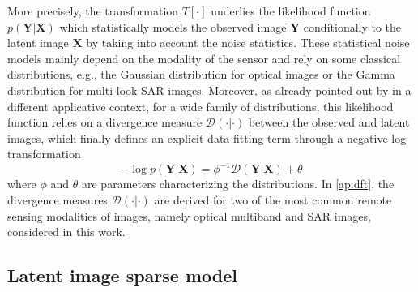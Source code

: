 \documentclass[review]{elsarticle}
\begin{document}
More precisely, the transformation $\mathit{T}[\cdot]$ underlies the likelihood function $p(\mathbf{Y}|\mathbf{X})$  which statistically models the observed image $\mathbf{Y}$ conditionally to the latent image $\mathbf{X}$ by taking into account the noise statistics. These statistical noise models mainly depend on the modality of the sensor and rely on some classical distributions, e.g., the Gaussian distribution for optical images or the Gamma distribution for multi-look SAR images. Moreover, as already pointed out by \citet{fevotte_nonnegative_2009} in a different applicative context, for a wide family of distributions, this likelihood function relies on a divergence measure $\mathcal{D}(\cdot|\cdot)$ between the observed and latent images, which finally defines an explicit data-fitting term through a negative-log transformation
\begin{equation}
			- \log p(\mathbf{Y}|\mathbf{X}) = \phi^{-1} \mathcal{D}(\mathbf{Y}|\mathbf{X}) + \theta
\end{equation}
where $\phi$ and $\theta$ are parameters characterizing the distributions. In \ref{ap:dft}, the divergence measures $\mathcal{D}(\cdot|\cdot)$ are derived for two of the most common remote sensing modalities of images, namely optical multiband and SAR images, considered in this work.


\subsection{Latent image sparse model}\label{subsec:sparse_model}
\end{document}
